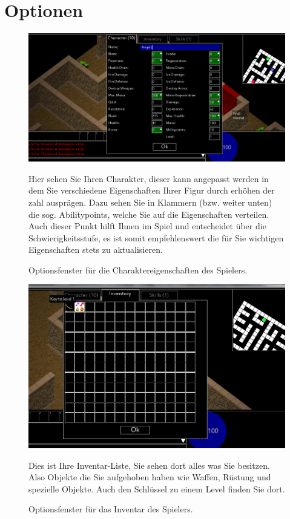 \documentclass[12pt, a4paper]{scrreprt}
\begin{document}
\section{Optionen}
\begin{figure}[h]
\includegraphics[width=\textwidth]{img/character}
\caption{Optionsfenster für die Charaktereigenschaften des Spielers.}
\vspace{1cm}
Hier sehen Sie Ihren Charakter, dieser kann angepasst werden in dem Sie verschiedene Eigenschaften Ihrer Figur durch erhöhen der zahl ausprägen. Dazu sehen Sie in Klammern (bzw. weiter unten) die sog. Abilitypoints, welche Sie auf die Eigenschaften verteilen. Auch dieser Punkt hilft Ihnen im Spiel und entscheidet über die Schwierigkeitsstufe, es ist somit empfehlenswert die für Sie wichtigen Eigenschaften stets zu aktualisieren.
\end{figure}
\begin{figure}[h]
\includegraphics[width=\textwidth]{img/inventory_havekey}
\caption{Optionsfenster für das Inventar des Spielers.}
\vspace{1cm}
Dies ist Ihre Inventar-Liste, Sie sehen dort alles was Sie besitzen. Also Objekte die Sie aufgehoben haben wie Waffen, Rüstung und spezielle Objekte. Auch den Schlüssel zu einem Level finden Sie dort.
\end{figure}
\end{document}
